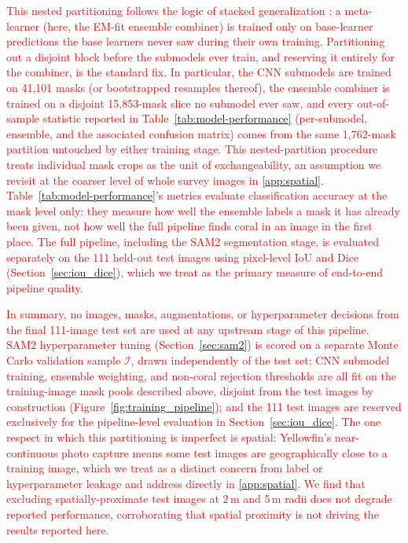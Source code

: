 \documentclass[11pt]{elsarticle}
\newcommand{\revadd}[1]{\textcolor{red}{#1}}
\begin{document}
\revadd{This nested partitioning follows the logic of stacked generalization \citep{wolpert1992stacked}: a meta-learner (here, the EM-fit ensemble combiner) is trained only on base-learner predictions the base learners never saw during their own training. Partitioning out a disjoint block before the submodels ever train, and reserving it entirely for the combiner, is the standard fix. In particular, the CNN submodels are trained on 41,101 masks (or bootstrapped resamples thereof), the ensemble combiner is trained on a disjoint 15,853-mask slice no submodel ever saw, and every out-of-sample statistic reported in Table~\ref{tab:model-performance} (per-submodel, ensemble, and the associated confusion matrix) comes from the same 1,762-mask partition untouched by either training stage. This nested-partition procedure treats individual mask crops as the unit of exchangeability, an assumption we revisit at the coarser level of whole survey images in \ref{app:spatial}. Table~\ref{tab:model-performance}'s metrics evaluate classification accuracy at the mask level only: they measure how well the ensemble labels a mask it has already been given, not how well the full pipeline finds coral in an image in the first place. The full pipeline, including the SAM2 segmentation stage, is evaluated separately on the 111 held-out test images using pixel-level IoU and Dice (Section~\ref{sec:iou_dice}), which we treat as the primary measure of end-to-end pipeline quality.}

\revadd{In summary, no images, masks, augmentations, or hyperparameter decisions from the final 111-image test set are used at any upstream stage of this pipeline. SAM2 hyperparameter tuning (Section~\ref{sec:sam2}) is scored on a separate Monte Carlo validation sample $\mathcal{I}$, drawn independently of the test set; CNN submodel training, ensemble weighting, and non-coral rejection thresholds are all fit on the training-image mask pools described above, disjoint from the test images by construction (Figure~\ref{fig:training_pipeline}); and the 111 test images are reserved exclusively for the pipeline-level evaluation in Section~\ref{sec:iou_dice}. The one respect in which this partitioning is imperfect is spatial: Yellowfin's near-continuous photo capture means some test images are geographically close to a training image, which we treat as a distinct concern from label or hyperparameter leakage and address directly in \ref{app:spatial}. We find that excluding spatially-proximate test images at 2\,m and 5\,m radii does not degrade reported performance, corroborating that spatial proximity is not driving the results reported here.}
\end{document}

